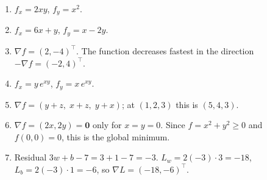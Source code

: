 \begin{enumerate}[label=\textbf{\ansnum.\arabic*}]
  \item $f_x=2xy$, $f_y=x^2$.
  \item $f_x=6x+y$, $f_y=x-2y$.
  \item $\nabla f=(2,-4)^\top$. The function decreases fastest in the direction $-\nabla f=(-2,4)^\top$.
  \item $f_x=y\,e^{xy}$, $f_y=x\,e^{xy}$.
  \item $\nabla f=(y+z,\;x+z,\;y+x)$; at $(1,2,3)$ this is $(5,4,3)$.
  \item $\nabla f=(2x,2y)=\mathbf 0$ only for $x=y=0$. Since $f=x^2+y^2\ge0$ and $f(0,0)=0$, this is the global minimum.
  \item[\textbf{7.7}] Residual $3w+b-7=3+1-7=-3$. $L_w=2(-3)\cdot3=-18$, $L_b=2(-3)\cdot1=-6$, so $\nabla L=(-18,-6)^\top$.
\end{enumerate}

